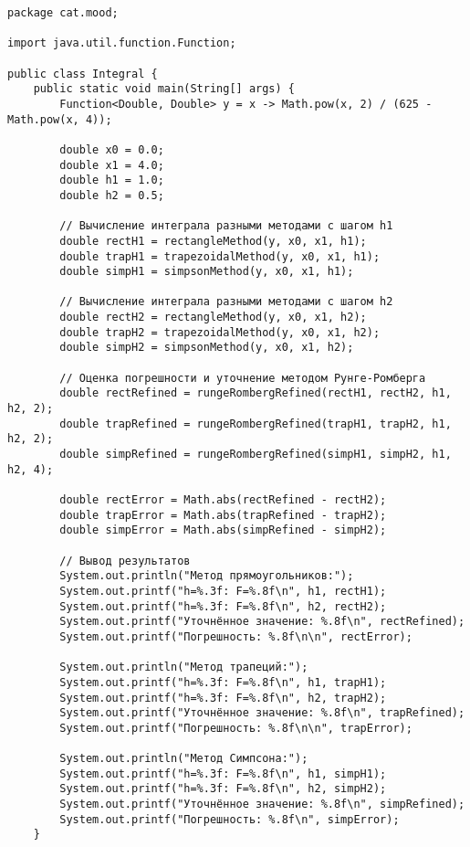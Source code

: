 \begin{verbatim}
package cat.mood;

import java.util.function.Function;

public class Integral {
    public static void main(String[] args) {
        Function<Double, Double> y = x -> Math.pow(x, 2) / (625 - Math.pow(x, 4));

        double x0 = 0.0;
        double x1 = 4.0;
        double h1 = 1.0;
        double h2 = 0.5;

        // Вычисление интеграла разными методами с шагом h1
        double rectH1 = rectangleMethod(y, x0, x1, h1);
        double trapH1 = trapezoidalMethod(y, x0, x1, h1);
        double simpH1 = simpsonMethod(y, x0, x1, h1);

        // Вычисление интеграла разными методами с шагом h2
        double rectH2 = rectangleMethod(y, x0, x1, h2);
        double trapH2 = trapezoidalMethod(y, x0, x1, h2);
        double simpH2 = simpsonMethod(y, x0, x1, h2);

        // Оценка погрешности и уточнение методом Рунге-Ромберга
        double rectRefined = rungeRombergRefined(rectH1, rectH2, h1, h2, 2);
        double trapRefined = rungeRombergRefined(trapH1, trapH2, h1, h2, 2);
        double simpRefined = rungeRombergRefined(simpH1, simpH2, h1, h2, 4);

        double rectError = Math.abs(rectRefined - rectH2);
        double trapError = Math.abs(trapRefined - trapH2);
        double simpError = Math.abs(simpRefined - simpH2);

        // Вывод результатов
        System.out.println("Метод прямоугольников:");
        System.out.printf("h=%.3f: F=%.8f\n", h1, rectH1);
        System.out.printf("h=%.3f: F=%.8f\n", h2, rectH2);
        System.out.printf("Уточнённое значение: %.8f\n", rectRefined);
        System.out.printf("Погрешность: %.8f\n\n", rectError);

        System.out.println("Метод трапеций:");
        System.out.printf("h=%.3f: F=%.8f\n", h1, trapH1);
        System.out.printf("h=%.3f: F=%.8f\n", h2, trapH2);
        System.out.printf("Уточнённое значение: %.8f\n", trapRefined);
        System.out.printf("Погрешность: %.8f\n\n", trapError);

        System.out.println("Метод Симпсона:");
        System.out.printf("h=%.3f: F=%.8f\n", h1, simpH1);
        System.out.printf("h=%.3f: F=%.8f\n", h2, simpH2);
        System.out.printf("Уточнённое значение: %.8f\n", simpRefined);
        System.out.printf("Погрешность: %.8f\n", simpError);
    }


\end{verbatim}
